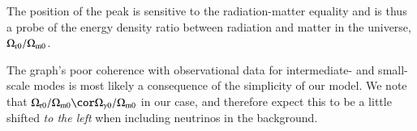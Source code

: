 The position of the peak is sensitive to the radiation-matter equality and is thus a probe of the energy density ratio between radiation and matter in the universe, $\Omega_{\mathrm{r}0}/\Omega_{\mathrm{m}0}$. 






The graph's poor coherence with observational data for intermediate- and small-scale modes is most likely a consequence of the simplicity of our model. We note that $\OmgR/\OmgM\cor \Omega_{\gamma 0}/\OmgM$ in our case, and therefore expect this to be a little shifted \emph{to the left} when including neutrinos in the background.  



